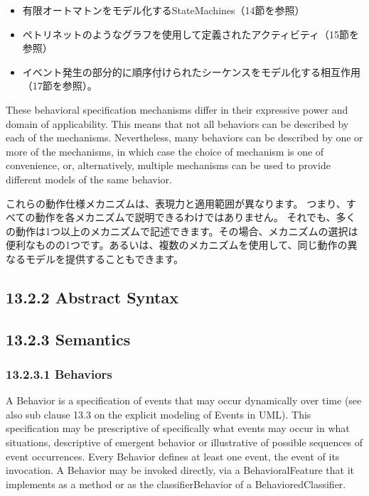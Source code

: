 \documentclass[a4paper,11pt]{ltjsarticle}
\begin{document}
\begin{itemize}
  \item 有限オートマトンをモデル化するStateMachines（14節を参照）
  \item ペトリネットのようなグラフを使用して定義されたアクティビティ（15節を参照）
  \item イベント発生の部分的に順序付けられたシーケンスをモデル化する相互作用（17節を参照）。
\end{itemize}


These behavioral specification mechanisms differ in their expressive power and domain of applicability. 
This means that not all behaviors can be described by each of the mechanisms. 
Nevertheless, many behaviors can be described by one or more of the mechanisms, in which case the choice of mechanism is one of convenience, or, alternatively, multiple mechanisms can be used to provide different models of the same behavior.

これらの動作仕様メカニズムは、表現力と適用範囲が異なります。
つまり、すべての動作を各メカニズムで説明できるわけではありません。
それでも、多くの動作は1つ以上のメカニズムで記述できます。その場合、メカニズムの選択は便利なものの1つです。あるいは、複数のメカニズムを使用して、同じ動作の異なるモデルを提供することもできます。


\subsection*{13.2.2 Abstract Syntax}

\subsection*{13.2.3 Semantics}

\subsubsection*{13.2.3.1 Behaviors}

A Behavior is a specification of events that may occur dynamically over time (see also sub clause 13.3 on the explicit modeling of Events in UML). 
This specification may be prescriptive of specifically what events may occur in what situations, descriptive of emergent behavior or illustrative of possible sequences of event occurrences. 
Every Behavior defines at least one event, the event of its invocation. 
A Behavior may be invoked directly, via a BehavioralFeature that it implements as a method or as the classifierBehavior of a BehavioredClassifier.
\end{document}
